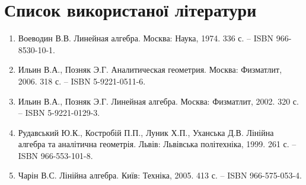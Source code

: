 \chapter{Список використаної літератури}


\begin{enumerate}[label=\arabic*)]
	\item Воеводин В.В. Линейная алгебра. Москва: Наука, 1974. 336 с. – ISBN 966-8530-10-1.
	\item Ильин В.А., Позняк Э.Г. Аналитическая геометрия. Москва: Физматлит, 2006. 318 с. – ISBN 5-9221-0511-6.
	\item Ильин В.А., Позняк Э.Г. Линейная алгебра. Москва: Физматлит, 2002. 320 с. – ISBN 5-9221-0129-3.
	\item Рудавський Ю.К., Костробій П.П., Луник Х.П., Уханська Д.В. Лінійна алгебра та аналітична геометрія. Львів: Львівська політехніка, 1999. 261 с. – ISBN 966-553-101-8.
	\item Чарін В.С. Лінійна алгебра. Київ: Техніка, 2005. 413 с. – ISBN 966-575-053-4. 
\end{enumerate}

